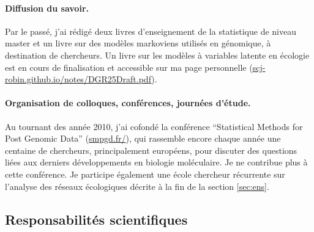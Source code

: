 
\paragraph{Diffusion du savoir.}
Par le passé, j'ai rédigé deux livres d'enseignement de la statistique de niveau master et un livre sur des modèles markoviens utilisés en génomique, à destination de chercheurs. 
Un livre sur les modèles à variables latente en écologie est en cours de finalisation et accessible sur ma page personnelle (\url{scj-robin.github.io/notes/DGR25Draft.pdf}).

\paragraph{Organisation de colloques, conférences, journées d'étude. }
Au tournant des année 2010, j'ai cofondé la conférence “Statistical Methods for Post Genomic Data” (\url{smpgd.fr/}), qui rassemble encore chaque année une centaine de chercheurs, principalement européens, pour discuter des questions liées aux derniers développements en biologie moléculaire. Je ne contribue plus à cette conférence. 
Je participe également une école chercheur récurrente sur l’analyse des réseaux écologiques décrite à la fin de la section \ref{sec:ens}. 



\subsection{Responsabilités scientifiques}


